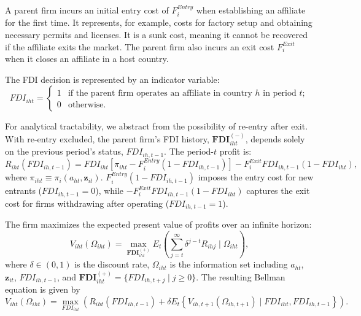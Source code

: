 \documentclass[preprint,11pt,authoryear]{elsarticle}
\begin{document}
A parent firm incurs an initial entry cost of $F_i^{Entry}$ when establishing an affiliate for the first time. It represents, for example, costs for factory setup and obtaining necessary permits and licenses. It is a sunk cost, meaning it cannot be recovered if the affiliate exits the market. The parent firm also incurs an exit cost $F_i^{Exit}$ when it closes an affiliate in a host country. 

The FDI decision is represented by an indicator variable:
$$
FDI_{iht} = 
\begin{cases}
1 & \text{if the parent firm operates an affiliate in country } h  \text{ in period } t; \\
0 & \text{otherwise}.
\end{cases}
$$

For analytical tractability, we abstract from the possibility of re-entry after exit. With re-entry excluded, the parent firm's FDI history, $\mathbf{FDI}_{iht}^{(-)}$, depends solely on the previous period's status, $FDI_{ih,t-1}$. The period-$t$ profit is:
$$
R_{iht}(FDI_{ih, t-1}) = FDI_{iht} \left[ \pi_{iht} - F_i^{Entry} (1 - FDI_{ih,t-1}) \right] - F_i^{Exit} FDI_{ih,t-1} (1 - FDI_{iht}),
$$
where $\pi_{iht} \equiv \pi_i(a_{ht}, \mathbf{z}_{it})$. $F_i^{Entry} (1 - FDI_{ih,t-1})$ imposes the entry cost for new entrants ($FDI_{ih,t-1} = 0$), while $- F_i^{Exit} FDI_{ih,t-1} (1 - FDI_{iht})$ captures the exit cost for firms withdrawing after operating ($FDI_{ih,t-1} = 1$).

The firm maximizes the expected present value of profits over an infinite horizon:
$$
V_{iht}(\Omega_{iht}) = \max_{\mathbf{FDI}_{iht}^{(+)}} E_t \left( \sum_{j=t}^{\infty} \delta^{j-t} R_{ihj} \mid \Omega_{iht} \right),
$$
where $\delta \in (0,1)$ is the discount rate, $\Omega_{iht}$ is the information set including $a_{ht}$, $\mathbf{z}_{it}$, $FDI_{ih,t-1}$, and $\mathbf{FDI}_{iht}^{(+)} = \{FDI_{ih,t+j} \mid j \geq 0\}$. The resulting Bellman equation is given by
\begin{equation}\label{eq:Bellman}
    V_{iht}(\Omega_{iht}) = \max_{FDI_{iht}} \left( R_{iht}(FDI_{ih, t-1}) + \delta E_t \left\{ V_{ih,t+1}(\Omega_{ih,t+1}) \mid FDI_{iht}, FDI_{ih, t-1} \right\} \right).
\end{equation}
\end{document}
